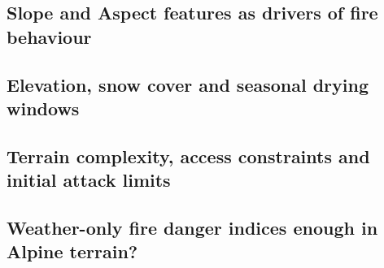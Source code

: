 \documentclass[11pt,a4paper]{article}
\begin{document}
\subsection{Slope and Aspect features as drivers of fire behaviour}

\subsection{Elevation, snow cover and seasonal drying windows}

\subsection{Terrain complexity, access constraints and initial attack limits}

\subsection{Weather-only fire danger indices enough in Alpine terrain?}







\end{document}
